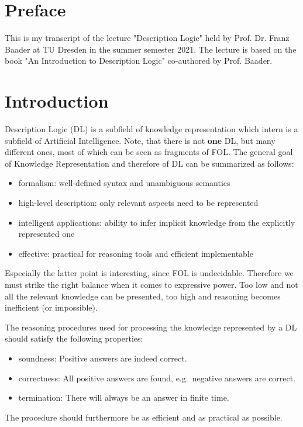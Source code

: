 \setcounter{chapter}{-1}
\chapter{Preface}
This is my transcript of the lecture "Description Logic" held by Prof. Dr. Franz Baader at TU Dresden in the summer semester 2021.
The lecture is based on the book "An Introduction to Description Logic" \cite{baader_dl_17} co-authored by Prof. Baader.

\chapter{Introduction}
Description Logic (DL) is a subfield of knowledge representation which intern is a subfield of Artificial Intelligence.
Note, that there is not \textbf{one} DL, but many different ones, most of which can be seen as fragments of FOL.
The general goal of Knowledge Representation and therefore of DL can be summarized as follows:
\begin{itemize}
	\item formalism: well-defined syntax and unambiguous semantics
	\item high-level description: only relevant aspects need to be represented
	\item intelligent applications: ability to infer implicit knowledge from the explicitly represented one
	\item effective: practical for reasoning tools and efficient implementable
\end{itemize}
Especially the latter point is interesting, since FOL is undecidable.
Therefore we must strike the right balance when it comes to expressive power.
Too low and not all the relevant knowledge can be presented, too high and reasoning becomes inefficient (or impossible).

The reasoning procedures used for processing the knowledge represented by a DL should satisfy the following properties:
\begin{itemize}
	\item soundness: Positive answers are indeed correct. 
	\item correctness: All positive answers are found, e.g.\ negative answers are correct.
	\item termination: There will always be an answer in finite time.
\end{itemize}
The procedure should furthermore be as efficient and as practical as possible.

